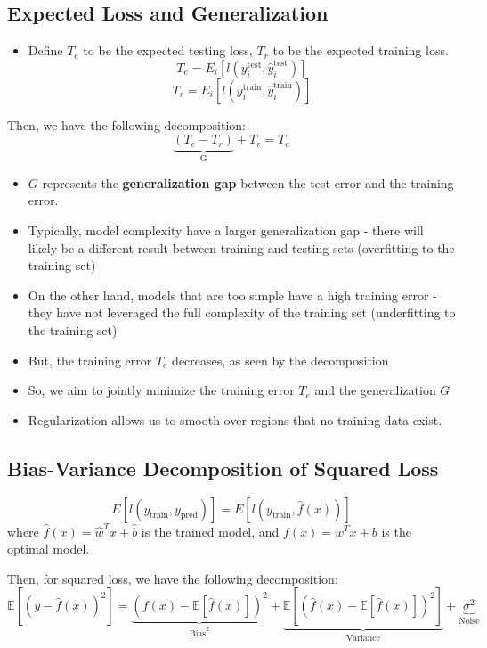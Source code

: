 \documentclass{article}
\begin{document}
\subsection{Expected Loss and Generalization}
\begin{itemize}
    \item Define $T_e$ to be the expected testing loss, $T_r$ to be the expected training loss.
    \[
        T_e = E_i[l(y_i^{\text{test}}, \hat{y}_i^{\text{test}})]
    \]
    \[
        T_r = E_i[l(y_i^{\text{train}}, \hat{y}_i^{\text{train}})]
    \]
\end{itemize}
Then, we have the following decomposition:
\[
    \underbrace{(T_e - T_r)}_{\text{G}} + T_r = T_e
\]
\begin{itemize}
    \item $G$ represents the \textbf{generalization gap} between the test error and the training error.
    \item Typically, model complexity have a larger generalization gap - there will likely be a different result between training and testing sets (overfitting to the training set)
    \item On the other hand, models that are too simple have a high training error -they have not leveraged the full complexity of the training set (underfitting to the training set)
    \item But, the training error $T_e$ decreases, as seen by the decomposition
    \item So, we aim to jointly minimize the training error $T_e$ and the generalization $G$
    \item Regularization allows us to smooth over regions that no training data exist.
\end{itemize}

\subsection{Bias-Variance Decomposition of Squared Loss}
\[
    E[l(y_{\text{train}}, y_{\text{pred}})] = E[l(y_{\text{train}}, \hat{f}(x))]
\]
where $\hat{f}(x) = \hat{w}^Tx+\hat{b}$ is the trained model, and $f(x) = w^Tx+b$ is the optimal model.

Then, for squared loss, we have the following decomposition:
\[
\mathbb{E}\left[(y - \hat{f}(x))^2\right]
=
\underbrace{\left(f(x) - \mathbb{E}\left[\hat{f}(x)\right]\right)^2}_{\text{Bias}^2}
+
\underbrace{\mathbb{E}\left[\left(\hat{f}(x) - \mathbb{E}\left[\hat{f}(x)\right]\right)^2\right]}_{\text{Variance}}
+
\underbrace{\sigma^2}_{\text{Noise}}
\]
\end{document}
